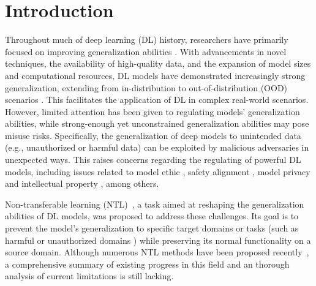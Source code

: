 

\vspace{-1mm}
\section{Introduction}\label{sec:introduction}

Throughout much of deep learning (DL) history, researchers have primarily focused on improving generalization abilities \cite{neyshabur2017exploring,liu2021towards,zhuang2020comprehensive,yuan2025instance,yang2020rethinking,foret2020sharpness}. 
With advancements in novel techniques, the availability of high-quality data, and the expansion of model sizes and computational resources, DL models have demonstrated increasingly strong generalization, extending from in-distribution to out-of-distribution (OOD) scenarios \cite{wang2022generalizing,radford2021learning,ye2022ood,kaplan2020scaling,hendrycks2021many,li2022out,huang2023winning,zou2024towards,guo2024investigating}. 
This facilitates the application of DL in complex real-world scenarios.
However, limited attention has been given to regulating models' generalization abilities, while strong-enough yet unconstrained generalization abilities may pose misuse risks. Specifically, the generalization of deep models to unintended data (e.g., unauthorized or harmful data) can be exploited by malicious adversaries in unexpected ways. 
This raises concerns regarding the regulating of powerful DL models, including issues related to model ethic \cite{li2023trustworthy,jiao2024navigating}, safety alignment \cite{ouyang2022training,huang2024harmful,ji2024beavertails,yin2025safeworld}, model privacy and intellectual property \cite{sun2023deep,wang2024training,chen2024watermark,wuresilient,wangdefense,jiang2024intellectual}, among others.


Non-transferable learning (NTL)~\cite{wang2021non}, a task aimed at reshaping the generalization abilities of DL models, was proposed to address these challenges. 
Its goal is to prevent the model's generalization to specific target domains or tasks (such as harmful \cite{rosati2024representation,huang2024harmful} or unauthorized domains \cite{wang2021non,si2024iclguard}) while preserving its normal functionality on a source domain. Although numerous NTL methods have been proposed recently~\cite{zeng2022unsupervised,wang2023model,wang2023domain,hong2024improving,peng2024map,zhou2024archlock,hong2024your,deng2024sophon,si2024iclguard,rosati2024representation,wang2024say,ding2024non,xiang2025jailbreaking}, a comprehensive summary of existing progress in this field and an thorough analysis of current limitations is still lacking.

